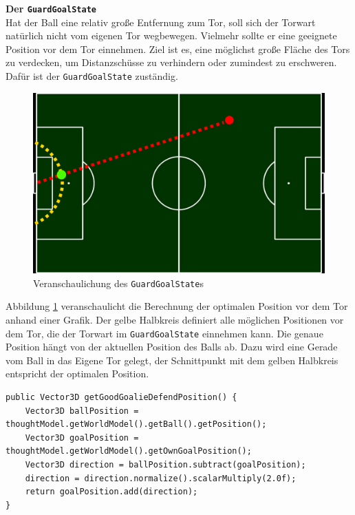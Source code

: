 \documentclass[fontsize=12pt,a4paper,final]{scrartcl}[2003/01/01]
\makeatletter
\def\ScaleIfNeeded{%
	\ifdim\Gin@nat@width>\linewidth
		\linewidth
	\else
		\Gin@nat@width
	\fi
}
\makeatother
\begin{document}
\textbf{Der \lstinline$GuardGoalState$}
\\

Hat der Ball eine relativ große Entfernung zum Tor, soll sich der Torwart natürlich nicht vom eigenen Tor wegbewegen. Vielmehr sollte er eine geeignete Position vor dem Tor einnehmen. Ziel ist es, eine möglichst große Fläche des Tors zu \glqq verdecken\grqq, um Distanzschüsse zu verhindern oder zumindest zu erschweren. Dafür ist der \lstinline$GuardGoalState$ zuständig.
\\

\begin{figure}[H]
	\centering
	\includegraphics[width=\ScaleIfNeeded]{Grafiken/KI/guard_goal}
	\caption{Veranschaulichung des \lstinline$GuardGoalState$s}
	\label{Veranschaulichung des GuardGoalState}
\end{figure}

Abbildung \ref{Veranschaulichung des GuardGoalState} veranschaulicht die Berechnung der optimalen Position vor dem Tor anhand einer Grafik. Der gelbe Halbkreis definiert alle möglichen Positionen vor dem Tor, die der Torwart im \lstinline$GuardGoalState$ einnehmen kann. Die genaue Position hängt von der aktuellen Position des Balls ab. Dazu wird eine Gerade vom Ball in das Eigene Tor gelegt, der Schnittpunkt mit dem gelben Halbkreis entspricht der optimalen Position.
\\

\begin{lstlisting}[caption=Umsetzung des \lstinline$GuardGoalState$s, captionpos=b, label=Umsetzung des GuardGoalState]
public Vector3D getGoodGoalieDefendPosition() {  
	Vector3D ballPosition = thoughtModel.getWorldModel().getBall().getPosition();  
	Vector3D goalPosition = thoughtModel.getWorldModel().getOwnGoalPosition();    
	Vector3D direction = ballPosition.subtract(goalPosition);  
	direction = direction.normalize().scalarMultiply(2.0f);  
	return goalPosition.add(direction);  
}  

\end{lstlisting}
\end{document}
